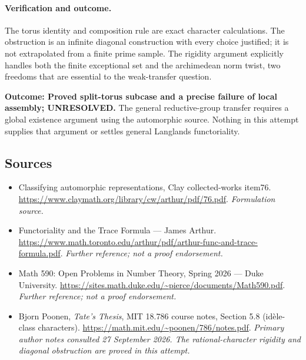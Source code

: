 \documentclass[11pt]{article}
\begin{document}
\paragraph{Verification and outcome.}
The torus identity and composition rule are exact character
calculations. The obstruction is an infinite diagonal construction
with every choice justified; it is not extrapolated from a finite
prime sample. The rigidity argument explicitly handles both the
finite exceptional set and the archimedean norm twist, two freedoms
that are essential to the weak-transfer question.

\textbf{Outcome: Proved split-torus subcase and a precise failure of
local assembly; UNRESOLVED.} The general reductive-group transfer
requires a global existence argument using the automorphic source.
Nothing in this attempt supplies that argument or settles general
Langlands functoriality.

\subsection{Sources}
\begin{itemize}
\item[S1]Classifying automorphic representations, Clay collected-works item76.
\url{https://www.claymath.org/library/cw/arthur/pdf/76.pdf}.
\textit{Formulation source.}
\item[S2]Functoriality and the Trace Formula — James Arthur.
\url{https://www.math.toronto.edu/arthur/pdf/arthur-func-and-trace-formula.pdf}.
\textit{Further reference; not a proof endorsement.}
\item[S3]Math 590: Open Problems in Number Theory, Spring 2026 — Duke University.
\url{https://sites.math.duke.edu/~pierce/documents/Math590.pdf}.
\textit{Further reference; not a proof endorsement.}
\item[E1]Bjorn Poonen, \emph{Tate's Thesis}, MIT 18.786 course notes, Section 5.8 (id\`ele-class characters).
\url{https://math.mit.edu/~poonen/786/notes.pdf}.
\textit{Primary author notes consulted 27 September 2026. The rational-character rigidity and diagonal obstruction are proved in this attempt.}
\end{itemize}
\end{document}
